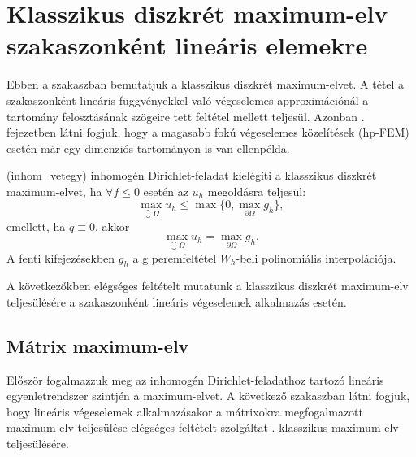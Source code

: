 \section{Klasszikus diszkrét maximum-elv szakaszonként lineáris elemekre}\label{sec:classical_DMP}

Ebben a szakaszban bemutatjuk a klasszikus diszkrét maximum-elvet. A tétel a szakaszonként lineáris függvényekkel való végeselemes approximációnál a tartomány felosztásának szögeire tett feltétel mellett teljesül. Azonban . fejezetben látni fogjuk, hogy a magasabb fokú végeselemes közelítések (hp-FEM) esetén már egy dimenziós tartományon is van ellenpélda. 

\begin{definition}\label{cDMP}
	\Aref({inhom_vetegy}) inhomogén Dirichlet-feladat kielégíti a klasszikus diszkrét maximum-elvet, ha  $\forall f \leq 0$ esetén az $u_h$ megoldásra teljesül:
	\begin{equation}\label{eq:cDMP_alt}
		\max_{\closure{\Omega}} u_h \leq \max \{0, \max_{\partial\Omega} g_h\},
	\end{equation}
	emellett, ha $q \equiv 0$, 
	akkor
	\begin{equation}\label{eq:cDMP_alt_0q}
		\max_{\closure{\Omega}} u_h =  \max_{\partial\Omega} g_h.
	\end{equation}
	A fenti kifejezésekben $g_h$ a g peremfeltétel $W_h$-beli polinomiális interpolációja.
\end{definition}

A következőkben elégséges feltételt mutatunk a klasszikus diszkrét maximum-elv teljesülésére a szakaszonként lineáris végeselemek alkalmazás esetén.

\subsection{Mátrix maximum-elv}

Először fogalmazzuk meg az inhomogén Dirichlet-feladathoz tartozó lineáris egyenletrendszer szintjén a maximum-elvet. A következő szakaszban látni fogjuk, hogy lineáris végeselemek alkalmazásakor a mátrixokra megfogalmazott maximum-elv teljesülése elégséges feltételt szolgáltat . klasszikus maximum-elv teljesülésére.

